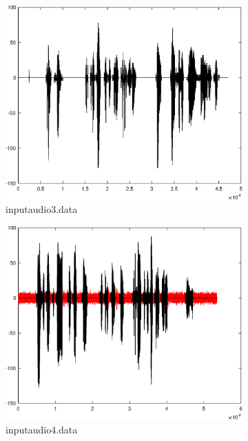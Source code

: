 \documentclass[10pt,twocolumn]{article}
\begin{document}
{\begin{figure}[ht]
  \begin{subfigure}{0.45\linewidth}
    \centering
    \includegraphics[scale=0.22]{images/res3.eps}
    \caption{inputaudio3.data}
  \end{subfigure}
  \begin{subfigure}{0.45\linewidth}
    \centering
    \includegraphics[scale=0.22]{images/res4.eps}
    \caption{inputaudio4.data}
  \end{subfigure}
  \par\medskip
  \begin{subfigure}{0.45\linewidth}

\end{subfigure}
\end{figure}}
\end{document}
